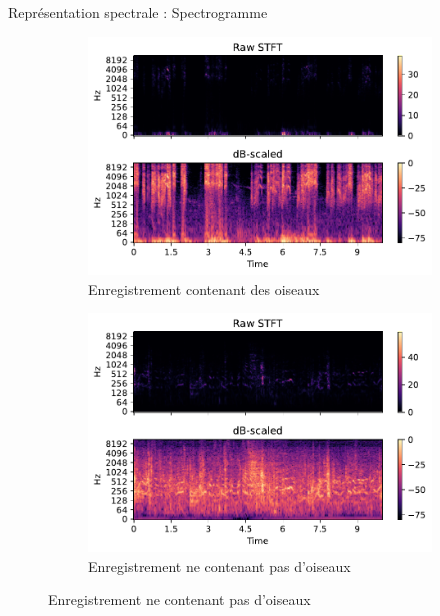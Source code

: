 \documentclass[compress,xcolor=table]{beamer}
\begin{document}
\begin{frame}{Représentation spectrale : Spectrogramme}
\begin{figure}[ht]
        \vspace{-0.7cm}

        \begin{subfigure}[b]{0.45\textwidth}
            \centering
            \includegraphics[width=\textwidth]{../images/audio/birds.spectrogram.ff1010.pdf}
            \caption{Enregistrement contenant des oiseaux}
            \label{fig:birds.spectrogram.ff1010}
        \end{subfigure}
        \hfill
        \begin{subfigure}[b]{0.45\textwidth}
            \centering
            \includegraphics[width=\textwidth]{../images/audio/nobirds.spectrogram.ff1010.pdf}
            \caption{Enregistrement ne contenant pas d'oiseaux}
            \label{fig:nobirds.spectrogram.ff1010}
        \end{subfigure}
    \end{figure}

\end{frame}
\end{document}
